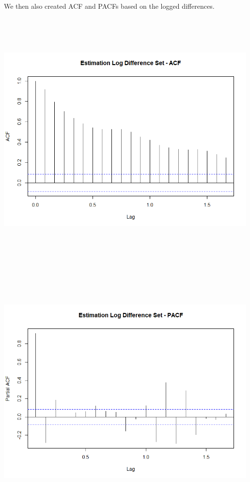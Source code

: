 \documentclass[
]{article}
\begin{document}
We then also created ACF and PACFs based on the logged differences.

\includegraphics[width=5.20833in,height=5.20833in]{03_visuals/ld_est_acf.png}

\includegraphics[width=5.20833in,height=5.20833in]{03_visuals/ld_est_pacf.png}
\end{document}
